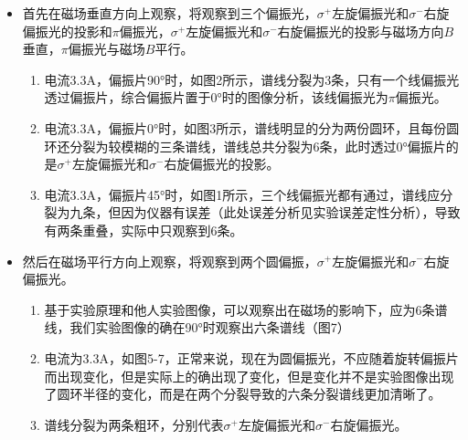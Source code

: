 \documentclass[dvipsnames, svgnames,a4paper,11pt]{article}
\begin{document}
		\begin{itemize}
			\item 首先在磁场垂直方向上观察，将观察到三个偏振光，$\sigma^+$左旋偏振光和$\sigma^-$右旋偏振光的投影和$\pi$偏振光，$\sigma^+$左旋偏振光和$\sigma^-$右旋偏振光的投影与磁场方向$B$垂直，$\pi$偏振光与磁场$B$平行。
			
				\begin{enumerate}
					\item 电流3.3A，偏振片90°时，如图2所示，谱线分裂为3条，只有一个线偏振光透过偏振片，综合偏振片置于0°时的图像分析，该线偏振光为$\pi$偏振光。
					\item 电流3.3A，偏振片0°时，如图3所示，谱线明显的分为两份圆环，且每份圆环还分裂为较模糊的三条谱线，谱线总共分裂为6条，此时透过0°偏振片的是$\sigma^+$左旋偏振光和$\sigma^-$右旋偏振光的投影。
					\item 电流3.3A，偏振片45°时，如图1所示，三个线偏振光都有通过，谱线应分裂为九条，但因为仪器有误差（此处误差分析见实验误差定性分析），导致有两条重叠，实际中只观察到6条。
					
				\end{enumerate}

			\item 然后在磁场平行方向上观察，将观察到两个圆偏振，$\sigma^+$左旋偏振光和$\sigma^-$右旋偏振光。
				
				\begin{enumerate}
					\item 基于实验原理和他人实验图像，可以观察出在磁场的影响下，应为6条谱线，我们实验图像的确在90°时观察出六条谱线（图7）
					\item 电流为3.3A，如图5-7，正常来说，现在为圆偏振光，不应随着旋转偏振片而出现变化，但是实际上的确出现了变化，但是变化并不是实验图像出现了圆环半径的变化，而是在两个分裂导致的六条分裂谱线更加清晰了。
					\item 谱线分裂为两条粗环，分别代表$\sigma^+$左旋偏振光和$\sigma^-$右旋偏振光。
				\end{enumerate}
		\end{itemize}
\end{document}
